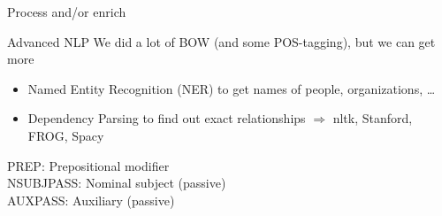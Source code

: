 \documentclass{beamer}
\begin{document}
{
	\begin{frame}[plain]
\end{frame}

}


\begin{frame}{Process and/or enrich}
	\begin{block}{Advanced NLP}
		We did a lot of BOW (and some POS-tagging), but we can get more
		\begin{itemize}
			\item Named Entity Recognition (NER) to get names of people, organizations, \ldots
			\item Dependency Parsing to find out exact relationships
			$\Rightarrow$ nltk, Stanford, FROG, Spacy
		\end{itemize}
	\end{block}
\end{frame}


{
\begin{frame}[plain]
PREP: Prepositional modifier \\
NSUBJPASS: Nominal subject (passive) \\
AUXPASS: Auxiliary (passive) \\
\end{frame}

}
\end{document}
